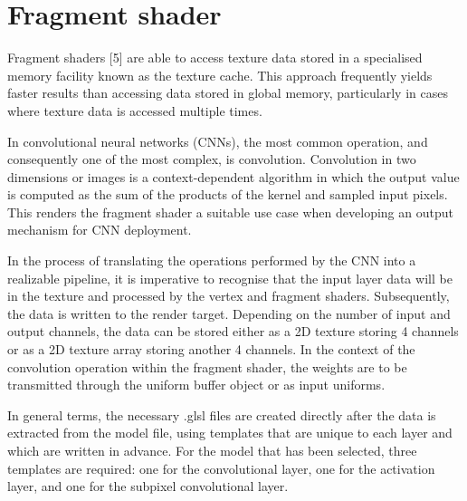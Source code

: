 \documentclass[conference]{IEEEtran}
\begin{document}
\section{Fragment shader}
Fragment shaders [5] are able to access texture data stored in a specialised memory facility known as the texture cache. This approach frequently yields faster results than accessing data stored in global memory, particularly in cases where texture data is accessed multiple times.
            
In convolutional neural networks (CNNs), the most common operation, and consequently one of the most complex, is convolution. Convolution in two dimensions or images is a context-dependent algorithm in which the output value is computed as the sum of the products of the kernel and sampled input pixels. This renders the fragment shader a suitable use case when developing an output mechanism for CNN deployment.

In the process of translating the operations performed by the CNN into a realizable pipeline, it is imperative to recognise that the input layer data will be in the texture and processed by the vertex and fragment shaders. Subsequently, the data is written to the render target. Depending on the number of input and output channels, the data can be stored either as a 2D texture storing 4 channels or as a 2D texture array storing another 4 channels. In the context of the convolution operation within the fragment shader, the weights are to be transmitted through the uniform buffer object or as input uniforms.
            
In general terms, the necessary .glsl files are created directly after the data is extracted from the model file, using templates that are unique to each layer and which are written in advance. For the model that has been selected, three templates are required: one for the convolutional layer, one for the activation layer, and one for the subpixel convolutional layer.
            
\end{document}
